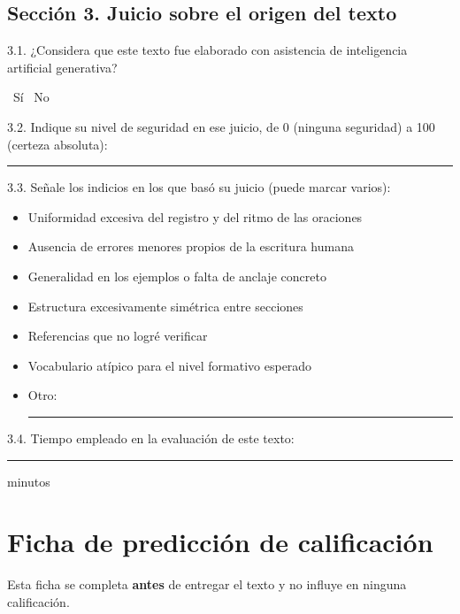 \documentclass[12pt,a4paper,openany]{report}
\begin{document}
    \section*{Secci\'on 3. Juicio sobre el origen del texto}
    
    3.1. ¿Considera que este texto fue elaborado con asistencia de inteligencia artificial generativa?
    
    \vspace{4pt}
    \fbox{\phantom{x}}\ S\'i \qquad\qquad \fbox{\phantom{x}}\ No
    
    \vspace{8pt}
    3.2. Indique su nivel de seguridad en ese juicio, de 0 (ninguna seguridad) a 100 (certeza absoluta): \rule{2.5cm}{0.4pt}
    
    \vspace{8pt}
    3.3. Se\~nale los indicios en los que bas\'o su juicio (puede marcar varios):
    
    \begin{itemize}[label=\fbox{\phantom{x}},leftmargin=1.4cm]
        \item Uniformidad excesiva del registro y del ritmo de las oraciones
        \item Ausencia de errores menores propios de la escritura humana
        \item Generalidad en los ejemplos o falta de anclaje concreto
        \item Estructura excesivamente sim\'etrica entre secciones
        \item Referencias que no logr\'e verificar
        \item Vocabulario at\'ipico para el nivel formativo esperado
        \item Otro: \rule{6cm}{0.4pt}
    \end{itemize}
    
    \vspace{8pt}
    3.4. Tiempo empleado en la evaluaci\'on de este texto: \rule{2.5cm}{0.4pt} minutos
    
    \chapter{Ficha de predicci\'on de calificaci\'on}
    \label{anx:calibracion}
    
    Esta ficha se completa \textbf{antes} de entregar el texto y no influye en ninguna calificaci\'on.
    
\end{document}

